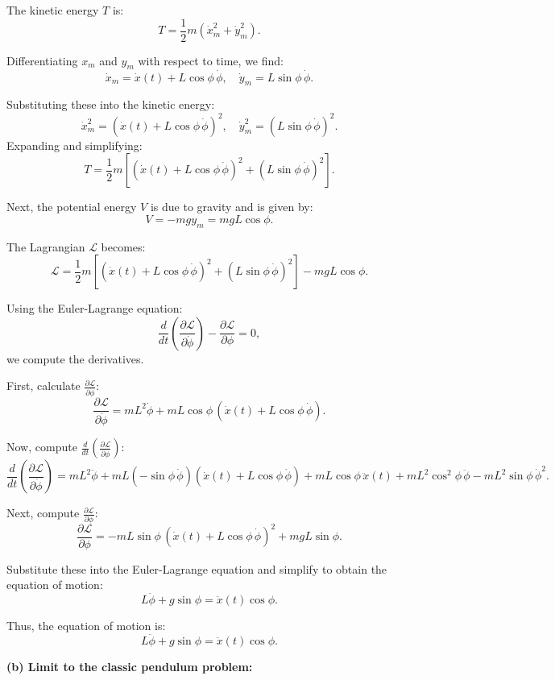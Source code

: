 The kinetic energy $T$ is:
\[
T = \frac{1}{2}m\left(\dot{x}_m^2 + \dot{y}_m^2\right).
\]

Differentiating $x_m$ and $y_m$ with respect to time, we find:
\[
\dot{x}_m = \dot{x}(t) + L\cos\phi \, \dot{\phi}, \quad \dot{y}_m = L\sin\phi \, \dot{\phi}.
\]

Substituting these into the kinetic energy:
\[
\dot{x}_m^2 = \left(\dot{x}(t) + L\cos\phi \, \dot{\phi}\right)^2, \quad
\dot{y}_m^2 = \left(L\sin\phi \, \dot{\phi}\right)^2.
\]
Expanding and simplifying:
\[
T = \frac{1}{2}m \left[\left(\dot{x}(t) + L\cos\phi \, \dot{\phi}\right)^2 + \left(L\sin\phi \, \dot{\phi}\right)^2 \right].
\]

Next, the potential energy $V$ is due to gravity and is given by:
\[
V = -mg y_m = mgL\cos\phi.
\]

The Lagrangian $\mathcal{L}$ becomes:
\[
\mathcal{L} = \frac{1}{2}m \left[\left(\dot{x}(t) + L\cos\phi \, \dot{\phi}\right)^2 + \left(L\sin\phi \, \dot{\phi}\right)^2 \right] - mgL\cos\phi.
\]

Using the Euler-Lagrange equation:
\[
\frac{d}{dt} \left(\frac{\partial \mathcal{L}}{\partial \dot{\phi}}\right) - \frac{\partial \mathcal{L}}{\partial \phi} = 0,
\]
we compute the derivatives.

First, calculate $\frac{\partial \mathcal{L}}{\partial \dot{\phi}}$:
\[
\frac{\partial \mathcal{L}}{\partial \dot{\phi}} = mL^2\dot{\phi} + mL\cos\phi \, \left(\dot{x}(t) + L\cos\phi \, \dot{\phi}\right).
\]

Now, compute $\frac{d}{dt}\left(\frac{\partial \mathcal{L}}{\partial \dot{\phi}}\right)$:
\[
\frac{d}{dt}\left(\frac{\partial \mathcal{L}}{\partial \dot{\phi}}\right) = mL^2\ddot{\phi} + mL(-\sin\phi \, \dot{\phi})\left(\dot{x}(t) + L\cos\phi \, \dot{\phi}\right) + mL\cos\phi \, \ddot{x}(t) + mL^2\cos^2\phi \, \ddot{\phi} - mL^2\sin\phi \, \dot{\phi}^2.
\]

Next, compute $\frac{\partial \mathcal{L}}{\partial \phi}$:
\[
\frac{\partial \mathcal{L}}{\partial \phi} = -mL\sin\phi \, \left(\dot{x}(t) + L\cos\phi \, \dot{\phi}\right)^2 + mgL\sin\phi.
\]

Substitute these into the Euler-Lagrange equation and simplify to obtain the equation of motion:
\[
L\ddot{\phi} + g\sin\phi = \ddot{x}(t)\cos\phi.
\]

Thus, the equation of motion is:
\[
\boxed{L\ddot{\phi} + g\sin\phi = \ddot{x}(t)\cos\phi.}
\]

\textbf{(b) Limit to the classic pendulum problem:}

